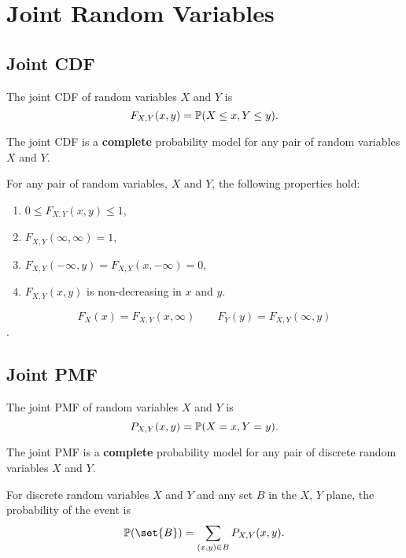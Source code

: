\chapter{Joint Random Variables}

\section{Joint CDF}
\begin{definition}
    The joint CDF of random variables $X$ and $Y$ is
    \[F_{X,Y}(x,y) = \P{X\leq x, Y\leq y}.\]
\end{definition}

The joint CDF is a \textbf{complete} probability model for any pair of random variables $X$ and $Y$.

\begin{theorem}
    For any pair of random variables, $X$ and $Y$, the following properties hold:
    \begin{enumerate}
        \item $0 \leq F_{X,Y}(x,y) \leq 1$,
        \item $F_{X,Y}(\infty,\infty)=1$,
        \item $F_{X,Y}(-\infty,y)=F_{X,Y}(x,-\infty)=0$,
        \item $F_{X,Y}(x,y)$ is non-decreasing in $x$ and $y$.
    \end{enumerate}
\end{theorem}

\begin{definition}
    \[F_X(x)=F_{X,Y}(x,\infty) \qquad F_Y(y)=F_{X,Y}(\infty,y)\].
\end{definition}

\section{Joint PMF}
\begin{definition}
    The joint PMF of random variables $X$ and $Y$ is
    \[P_{X,Y}(x,y) = \P{X=x, Y=y}.\]
\end{definition}

The joint PMF is a \textbf{complete} probability model for any pair of discrete random variables $X$ and $Y$.

\begin{theorem}
    For discrete random variables $X$ and $Y$ and any set $B$ in the $X$, $Y$ plane, the probability of the event
    is
    \[\P{\set{B}}=\sum_{(x,y)\in B}P_{X,Y}(x,y).\]
\end{theorem}

